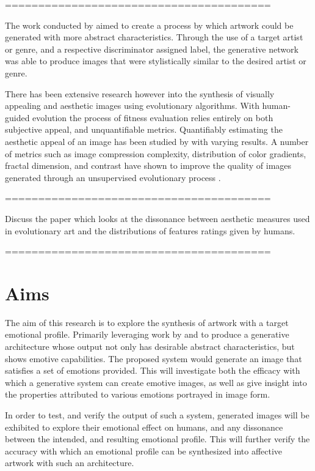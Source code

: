 \documentclass{article}
\begin{document}
========================================

The work conducted by \citet{tan2017artgan} aimed to create a process by which artwork could be generated with more abstract characteristics. 
Through the use of a target artist or genre, and a respective discriminator assigned label, the generative network was able to produce images that were stylistically similar to the desired artist or genre.

There has been extensive research however into the synthesis of visually appealing and aesthetic images using evolutionary algorithms.
With human-guided evolution \citep{nevar} the process of fitness evaluation relies entirely on both subjective appeal, and unquantifiable metrics.
Quantifiably estimating the aesthetic appeal of an image has been studied by \citet{den2010comparing, den2010using, den2011evolving} with varying results.
A number of metrics such as image compression complexity, distribution of color gradients, fractal dimension, and contrast have shown to improve the quality of images generated through an unsupervised evolutionary process \citep{den2014investigating}.

========================================

Discuss the paper \citet{johnson2019understanding} which looks at the dissonance between aesthetic measures used in evolutionary art and the distributions of features ratings given by humans.

========================================

\section{Aims}

The aim of this research is to explore the synthesis of artwork with a target emotional profile.
Primarily leveraging work by \citet{tan2017artgan} and \citet{kim2018building} to produce a generative architecture whose output not only has desirable abstract characteristics, but shows emotive capabilities.
The proposed system would generate an image that satisfies a set of emotions provided.
This will investigate both the efficacy with which a generative system can create emotive images, as well as give insight into the properties attributed to various emotions portrayed in image form.

In order to test, and verify the output of such a system, generated images will be exhibited to explore their emotional effect on humans, and any dissonance between the intended, and resulting emotional profile.
This will further verify the accuracy with which an emotional profile can be synthesized into affective artwork with such an architecture.
\end{document}
